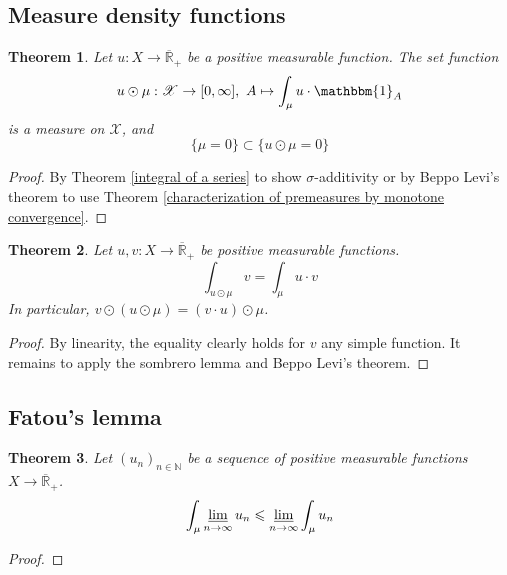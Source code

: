 \documentclass[11pt, a4paper, openany]{book}
\newtheorem{thm}{Theorem}\newtheorem{lem}{Lemma}\newtheorem{crl}{Corollary}
\theoremstyle{definition}
\newcommand{\er}{\overline{\mathbb{R}}}
\begin{document}
\subsection{Measure density functions}
    \begin{thm}
        Let $u:X\rightarrow \er_+$ be a positive measurable function. The set function
        \[
            u\odot \mu:\mathscr{X}\rightarrow [0,\infty],\,\,A\mapsto \int_\mu u\cdot \mathbbm{1}_A 
        \]
        is a measure on $\mathscr{X}$, and
        \[
            \{\mu=0\}\subset\{u\odot\mu=0\}
        \]
    \end{thm}
    \begin{proof}
        By Theorem \ref{integral of a series} to show $\sigma$-additivity or by Beppo Levi's theorem to use Theorem \ref{characterization of premeasures by monotone convergence}.
    \end{proof}
    \begin{thm}
        Let $u,v:X\rightarrow \er_+$ be positive measurable functions.
        \[
            \int_{u\odot \mu} v=\int_\mu u\cdot v
        \]
        In particular, $v\odot (u\odot \mu)=(v\cdot u)\odot \mu$.
    \end{thm}
    \begin{proof}
        By linearity, the equality clearly holds for $v$ any simple function. It remains to apply the sombrero lemma and Beppo Levi's theorem.
    \end{proof}
\subsection{Fatou's lemma}
    \begin{thm}
        Let $(u_n)_{n\in\mathbb{N}}$ be a sequence of positive measurable functions $X\rightarrow \er_+$.
        \[
            \int_\mu \varliminf_{n\to\infty} u_n \leqslant \varliminf_{n\to\infty} \int_\mu u_n
        \]
    \end{thm}
    \begin{proof}
        
    \end{proof}
\end{document}
